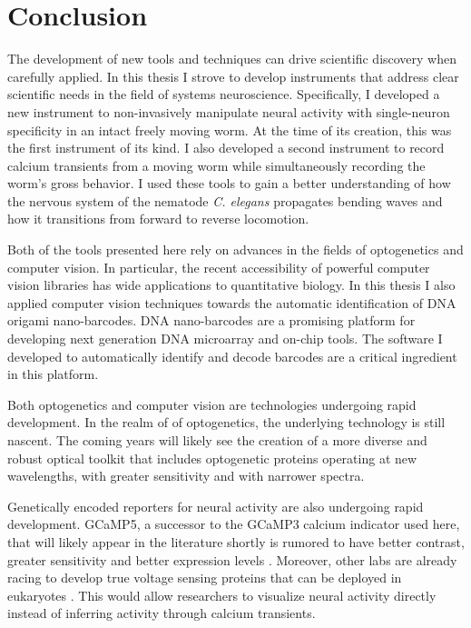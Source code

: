 
\chapter{Conclusion}
The development of new tools and techniques can drive scientific discovery when carefully applied. In this thesis I strove to develop instruments that address clear scientific needs in the field of systems neuroscience. Specifically, I developed a new instrument to non-invasively manipulate neural activity with single-neuron specificity  in an intact freely moving worm. At the time of its creation, this was the first instrument of its kind. I also developed a second instrument to record calcium transients from a moving worm while simultaneously recording the worm's gross behavior. I used these tools to gain  a better understanding of how the nervous system of the nematode \textit{C. elegans} propagates bending waves and how it transitions from forward to reverse locomotion.

Both of the tools presented here  rely on advances in the fields of optogenetics and computer vision. In particular, the recent accessibility of powerful computer vision libraries  has wide applications to quantitative biology. In this thesis I also applied computer vision techniques towards the automatic identification of  DNA origami nano-barcodes. DNA nano-barcodes are a promising platform for developing next generation DNA microarray and on-chip tools.  The software I developed to automatically identify and decode barcodes are a critical ingredient in this platform. 

Both optogenetics and computer vision are technologies undergoing rapid development.
In the realm of of optogenetics, the underlying technology is still nascent. The coming years will likely see the creation of a more diverse and robust optical toolkit that includes optogenetic proteins operating at new wavelengths, with greater sensitivity and with narrower spectra.  


Genetically encoded reporters for  neural activity are also undergoing rapid development. GCaMP5, a successor to the GCaMP3 calcium indicator used here, that will likely appear in the literature shortly is rumored to  have better contrast, greater sensitivity and better expression levels \citep{hires_gcamp5_2011}. Moreover, other labs are already racing to develop true voltage sensing proteins that can be deployed in eukaryotes \citep{kralj_electrical_2011}. This would allow researchers to visualize neural activity directly instead of inferring activity through calcium transients. 



